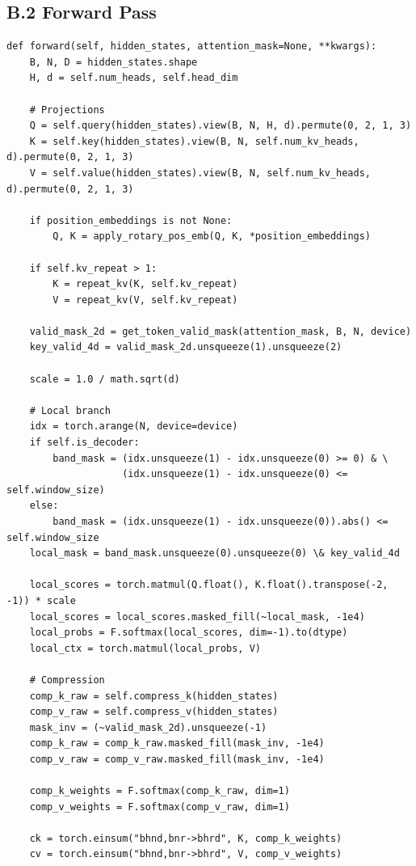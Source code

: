 \subsection{B.2 Forward Pass}

\begin{lstlisting}
def forward(self, hidden_states, attention_mask=None, **kwargs):
    B, N, D = hidden_states.shape
    H, d = self.num_heads, self.head_dim
    
    # Projections
    Q = self.query(hidden_states).view(B, N, H, d).permute(0, 2, 1, 3)
    K = self.key(hidden_states).view(B, N, self.num_kv_heads, d).permute(0, 2, 1, 3)
    V = self.value(hidden_states).view(B, N, self.num_kv_heads, d).permute(0, 2, 1, 3)
    
    if position_embeddings is not None:
        Q, K = apply_rotary_pos_emb(Q, K, *position_embeddings)
    
    if self.kv_repeat > 1:
        K = repeat_kv(K, self.kv_repeat)
        V = repeat_kv(V, self.kv_repeat)
    
    valid_mask_2d = get_token_valid_mask(attention_mask, B, N, device)
    key_valid_4d = valid_mask_2d.unsqueeze(1).unsqueeze(2)
    
    scale = 1.0 / math.sqrt(d)
    
    # Local branch
    idx = torch.arange(N, device=device)
    if self.is_decoder:
        band_mask = (idx.unsqueeze(1) - idx.unsqueeze(0) >= 0) & \
                    (idx.unsqueeze(1) - idx.unsqueeze(0) <= self.window_size)
    else:
        band_mask = (idx.unsqueeze(1) - idx.unsqueeze(0)).abs() <= self.window_size
    local_mask = band_mask.unsqueeze(0).unsqueeze(0) \& key_valid_4d
    
    local_scores = torch.matmul(Q.float(), K.float().transpose(-2, -1)) * scale
    local_scores = local_scores.masked_fill(~local_mask, -1e4)
    local_probs = F.softmax(local_scores, dim=-1).to(dtype)
    local_ctx = torch.matmul(local_probs, V)
    
    # Compression
    comp_k_raw = self.compress_k(hidden_states)
    comp_v_raw = self.compress_v(hidden_states)
    mask_inv = (~valid_mask_2d).unsqueeze(-1)
    comp_k_raw = comp_k_raw.masked_fill(mask_inv, -1e4)
    comp_v_raw = comp_v_raw.masked_fill(mask_inv, -1e4)
    
    comp_k_weights = F.softmax(comp_k_raw, dim=1)
    comp_v_weights = F.softmax(comp_v_raw, dim=1)
    
    ck = torch.einsum("bhnd,bnr->bhrd", K, comp_k_weights)
    cv = torch.einsum("bhnd,bnr->bhrd", V, comp_v_weights)
    

\end{lstlisting}
